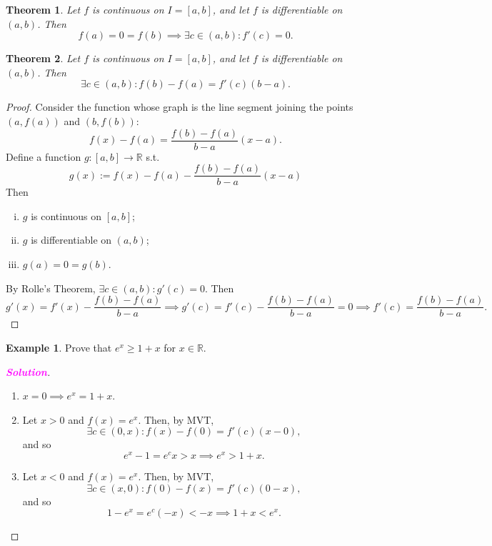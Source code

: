 \documentclass[12pt,openany]{book}
\newtheorem{theorem}{Theorem}[chapter]
\theoremstyle{definition}
\newtheorem{example}{Example}[chapter]
\newcommand{\R}{\mathbb{R}}
\newcommand{\sol}{\textcolor{magenta}{\bf Solution}}
\begin{document}
	\begin{tcolorbox}[colback=white,colframe=thmcolor,arc=5pt,title={\color{white}\bf $\star$ Rolle's Theorem}]
		\begin{theorem}
			Let $f$ is continuous on $I = [a, b]$, and let $f$ is differentiable on $(a,b)$. Then \[
			f(a)=0=f(b)\implies\exists c\in(a,b):f'(c)=0.
			\]
		\end{theorem}
	\end{tcolorbox}
	\vspace{8pt}
	\begin{tcolorbox}[colback=white,colframe=thmcolor,arc=5pt,title={\color{white}\bf $\star$ Mean Value Theorem of Differential Calculus $\star$}]
		\begin{theorem}
			Let $f$ is continuous on $I = [a, b]$, and let $f$ is differentiable on $(a,b)$. Then \[
			\exists c\in(a,b):f(b)-f(a)=f'(c)(b-a).
			\]
		\end{theorem}
	\end{tcolorbox}
	\begin{proof}
		Consider the function whose graph is the line segment joining the points \((a,f(a))\) and \((b,f(b))\): \[
		f(x)-f(a)=\frac{f(b)-f(a)}{b-a}(x-a).
		\] Define a function \(g:[a,b]\to\R\) s.t. \[
		g(x):=f(x)-f(a)-\frac{f(b)-f(a)}{b-a}(x-a)
		\] Then \begin{enumerate}[(i)]
			\item \(g\) is continuous on \([a,b]\);
			\item \(g\) is differentiable on \((a,b)\);
			\item \(g(a)=0=g(b)\). 
		\end{enumerate} By Rolle's Theorem, \(\exists c\in(a,b):g'(c)=0\). Then \[
		g'(x)=f'(x)-\frac{f(b)-f(a)}{b-a}\implies g'(c)=f'(c)-\frac{f(b)-f(a)}{b-a}=0\implies
		f'(c)=\frac{f(b)-f(a)}{b-a}.
		\]
	\end{proof}
	\vspace{8pt}
	\begin{example}
		Prove that $e^x\geq 1+x$ for $x\in\R$.
		\begin{proof}[\sol]
			\begin{enumerate}[(1)]
				\item \(x=0\implies e^x=1+x\).
				\item Let \(x>0\) and \(f(x)=e^x\). Then, by MVT, \[
				\exists c\in(0,x):f(x)-f(0)=f'(c)(x-0),
				\] and so \[
				e^x-1=e^cx> x\implies e^x>1+x.
				\]
				\item Let $x<0$ and $f(x)=e^x$. Then, by MVT, \[
				\exists c\in(x,0): f(0)-f(x)=f'(c)(0-x),
				\] and so \[
				1-e^x=e^c(-x)< -x\implies 1+x<e^x.
				\]
			\end{enumerate}
		\end{proof}
	\end{example}
	\newpage
\end{document}

